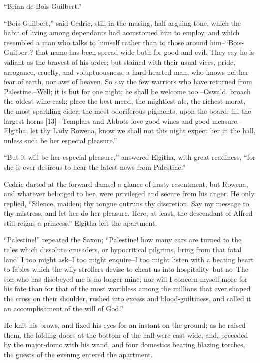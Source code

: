 ``Brian de Bois-Guilbert.''

``Bois-Guilbert,'' said Cedric, still in the musing, half-arguing tone,
which the habit of living among dependants had accustomed him to employ,
and which resembled a man who talks to himself rather than to those
around him--``Bois-Guilbert? that name has been spread wide both for
good and evil. They say he is valiant as the bravest of his order; but
stained with their usual vices, pride, arrogance, cruelty, and
voluptuousness; a hard-hearted man, who knows neither fear of earth, nor
awe of heaven. So say the few warriors who have returned from
Palestine.--Well; it is but for one night; he shall be welcome
too.--Oswald, broach the oldest wine-cask; place the best mead, the
mightiest ale, the richest morat, the most sparkling cider, the most
odoriferous pigments, upon the board; fill the largest horns {[}13{]}
--Templars and Abbots love good wines and good measure.--Elgitha, let
thy Lady Rowena, know we shall not this night expect her in the hall,
unless such be her especial pleasure.''

``But it will be her especial pleasure,'' answered Elgitha, with great
readiness, ``for she is ever desirous to hear the latest news from
Palestine.''

Cedric darted at the forward damsel a glance of hasty resentment; but
Rowena, and whatever belonged to her, were privileged and secure from
his anger. He only replied, ``Silence, maiden; thy tongue outruns thy
discretion. Say my message to thy mistress, and let her do her pleasure.
Here, at least, the descendant of Alfred still reigns a princess.''
Elgitha left the apartment.

``Palestine!'' repeated the Saxon; ``Palestine! how many ears are turned
to the tales which dissolute crusaders, or hypocritical pilgrims, bring
from that fatal land! I too might ask--I too might enquire--I too might
listen with a beating heart to fables which the wily strollers devise to
cheat us into hospitality--but no--The son who has disobeyed me is no
longer mine; nor will I concern myself more for his fate than for that
of the most worthless among the millions that ever shaped the cross on
their shoulder, rushed into excess and blood-guiltiness, and called it
an accomplishment of the will of God.''

He knit his brows, and fixed his eyes for an instant on the ground; as
he raised them, the folding doors at the bottom of the hall were cast
wide, and, preceded by the major-domo with his wand, and four domestics
bearing blazing torches, the guests of the evening entered the
apartment.
